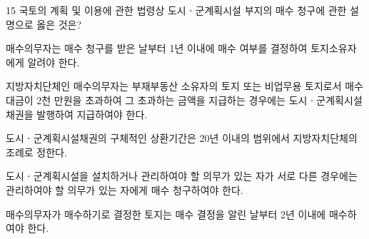 \begin{question}{15}
국토의 계획 및 이용에 관한 법령상 도시ㆍ군계획시설 부지의 매수 청구에 관한 설명으로 옳은 것은?
\begin{choices}
  \item 매수의무자는 매수 청구를 받은 날부터 1년 이내에 매수 여부를 결정하여 토지소유자에게 알려야 한다.
  \item 지방자치단체인 매수의무자는 부재부동산 소유자의 토지 또는 비업무용 토지로서 매수대금이 2천 만원을 초과하여 그 초과하는 금액을 지급하는 경우에는 도시ㆍ군계획시설채권을 발행하여 지급하여야 한다.
  \item 도시ㆍ군계획시설채권의 구체적인 상환기간은 20년 이내의 범위에서 지방자치단체의 조례로 정한다.
  \item 도시ㆍ군계획시설을 설치하거나 관리하여야 할 의무가 있는 자가 서로 다른 경우에는 관리하여야 할 의무가 있는 자에게 매수 청구하여야 한다.
  \item 매수의무자가 매수하기로 결정한 토지는 매수 결정을 알린 날부터 2년 이내에 매수하여야 한다.
\end{choices}
\end{question}
